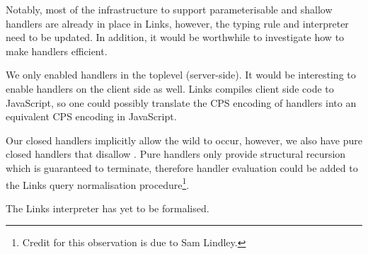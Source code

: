 Notably, most of the infrastructure to support parameterisable and shallow handlers are already in place in Links, however, the typing rule and interpreter need to be updated. In addition, it would be worthwhile to investigate how to make handlers efficient.

We only enabled handlers in the toplevel (server-side). It would be interesting to enable handlers on the client side as well. Links compiles client side code to JavaScript, so one could possibly translate the CPS encoding of handlers into an equivalent CPS encoding in JavaScript.

Our closed handlers implicitly allow the wild to occur, however, we also have pure closed handlers that disallow . Pure handlers only provide structural recursion which is guaranteed to terminate, therefore handler evaluation could be added to the Links query normalisation procedure\footnote{Credit for this observation is due to Sam Lindley.}.

The Links interpreter has yet to be formalised.
